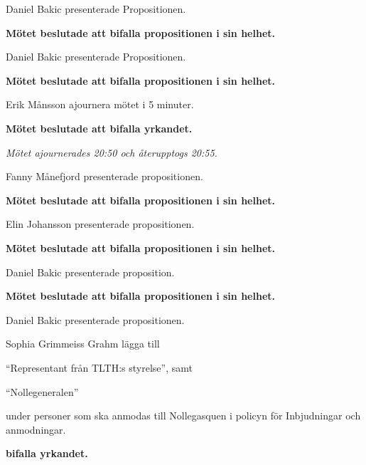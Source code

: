 \documentclass[10pt]{article}
\begin{document}
\begin{paragrafer}
\begin{paragrafer}
		\newpage
	\end{paragrafer}
    \begin{paragrafer}

		
		Daniel Bakic presenterade Propositionen.

		\textbf{Mötet beslutade att bifalla propositionen i sin helhet.}

		
		Daniel Bakic presenterade Propositionen.
		
		\textbf{Mötet beslutade att bifalla propositionen i sin helhet.}

		Erik Månsson \ypa ajournera mötet i 5 minuter.

		\textbf{Mötet beslutade att bifalla yrkandet.}

		\emph{Mötet ajournerades 20:50 och återupptogs 20:55.}

		
		Fanny Månefjord presenterade propositionen.

		\textbf{Mötet beslutade att bifalla propositionen i sin helhet.}

		Elin Johansson presenterade propositionen.

		\textbf{Mötet beslutade att bifalla propositionen i sin helhet.}


		Daniel Bakic presenterade proposition. 

		\textbf{Mötet beslutade att bifalla propositionen i sin helhet.}

		\newpage
		
		Daniel Bakic presenterade propositionen.
		
		Sophia Grimmeiss Grahm \ypa lägga till  
		\begin{tightdashlist}
			\item ``Representant från TLTH:s styrelse'', samt 
			\item ``Nollegeneralen''
		\end{tightdashlist}

		under personer som ska anmodas till Nollegasquen i policyn för Inbjudningar och anmodningar.

		\textbf{\Mba bifalla yrkandet.}


\end{paragrafer}
\end{paragrafer}
\end{document}
